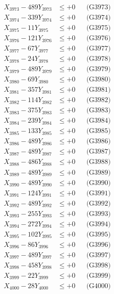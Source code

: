 \documentclass[a4paper,10pt]{article}
\begin{document}
{\begin{align}
X_{3973} - 489Y_{3973} &\leq +0 && \text{(G3973)} \\
X_{3974} - 339Y_{3974} &\leq +0 && \text{(G3974)} \\
X_{3975} - 11Y_{3975} &\leq +0 && \text{(G3975)} \\
X_{3976} - 121Y_{3976} &\leq +0 && \text{(G3976)} \\
X_{3977} - 67Y_{3977} &\leq +0 && \text{(G3977)} \\
X_{3978} - 24Y_{3978} &\leq +0 && \text{(G3978)} \\
X_{3979} - 489Y_{3979} &\leq +0 && \text{(G3979)} \\
X_{3980} - 69Y_{3980} &\leq +0 && \text{(G3980)} \\
\allowbreak
X_{3981} - 357Y_{3981} &\leq +0 && \text{(G3981)} \\
X_{3982} - 114Y_{3982} &\leq +0 && \text{(G3982)} \\
X_{3983} - 375Y_{3983} &\leq +0 && \text{(G3983)} \\
X_{3984} - 239Y_{3984} &\leq +0 && \text{(G3984)} \\
X_{3985} - 133Y_{3985} &\leq +0 && \text{(G3985)} \\
X_{3986} - 489Y_{3986} &\leq +0 && \text{(G3986)} \\
X_{3987} - 489Y_{3987} &\leq +0 && \text{(G3987)} \\
X_{3988} - 486Y_{3988} &\leq +0 && \text{(G3988)} \\
X_{3989} - 489Y_{3989} &\leq +0 && \text{(G3989)} \\
X_{3990} - 489Y_{3990} &\leq +0 && \text{(G3990)} \\
\allowbreak
X_{3991} - 124Y_{3991} &\leq +0 && \text{(G3991)} \\
X_{3992} - 489Y_{3992} &\leq +0 && \text{(G3992)} \\
X_{3993} - 255Y_{3993} &\leq +0 && \text{(G3993)} \\
X_{3994} - 272Y_{3994} &\leq +0 && \text{(G3994)} \\
X_{3995} - 102Y_{3995} &\leq +0 && \text{(G3995)} \\
X_{3996} - 86Y_{3996} &\leq +0 && \text{(G3996)} \\
X_{3997} - 489Y_{3997} &\leq +0 && \text{(G3997)} \\
X_{3998} - 458Y_{3998} &\leq +0 && \text{(G3998)} \\
X_{3999} - 22Y_{3999} &\leq +0 && \text{(G3999)} \\
X_{4000} - 28Y_{4000} &\leq +0 && \text{(G4000)} \\

\end{align}}
\end{document}
